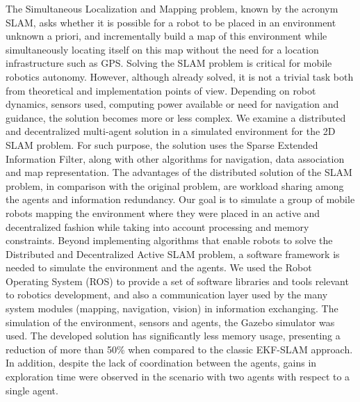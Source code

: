 The Simultaneous Localization and Mapping problem, known by the acronym SLAM, asks whether it is possible for a robot to be placed in an environment
unknown a priori, and incrementally build a map of this
environment while simultaneously locating itself on this map without the
need for a location infrastructure such as GPS.
Solving the SLAM problem is critical for mobile robotics
autonomy. However, although already solved, it is not a trivial task
both from theoretical and implementation points of view.
Depending on robot dynamics, sensors used, computing power available or need for navigation and guidance, the solution
becomes more or less complex. We examine a distributed and decentralized multi-agent solution in a simulated environment
for the 2D SLAM problem. For such purpose, the solution uses the Sparse Extended Information Filter, along with other algorithms for navigation,
data association and map representation. The advantages of the distributed solution of the
SLAM problem, in comparison with the original problem, are workload sharing
among the agents and information redundancy. Our goal is to simulate a 
group of mobile robots mapping the environment where they were placed 
in an active and decentralized fashion while taking into account 
processing and memory constraints.
Beyond implementing algorithms that enable robots to solve the 
Distributed and Decentralized Active SLAM problem, a software framework is needed to simulate the environment and the agents. We used the Robot Operating System (ROS) to provide a set of software libraries and tools relevant to robotics 
development, and also a communication layer used by the many system 
modules (mapping, navigation, vision) in information exchanging. The 
simulation of the environment, sensors and agents, the Gazebo simulator 
was used.
The developed solution has significantly less memory usage,
presenting a reduction of more than 50\% when compared to the classic EKF-SLAM approach.
In addition, despite the lack of coordination between the agents,
gains in exploration time were observed in the scenario with two agents with respect to a single agent.
